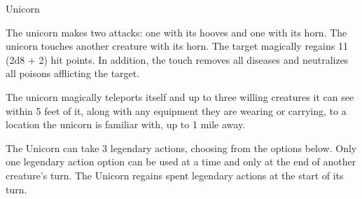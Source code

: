 \begin{DndMonster}[float*=htb,width=\textwidth + 8pt]{Unicorn}
\begin{multicols}{2}
 The unicorn makes two attacks: one with its hooves and one with its horn.
\DndMonsterAttack[
	name=Hooves,
	distance=melee,
	type=weapon,
	mod=+7,
	reach=5,
	dmg=\DndDice{2d4 + 4},
	dmg-type=bludgeoning
]
\DndMonsterAttack[
	name=Horn,
	distance=melee,
	type=weapon,
	mod=+7,
	reach=5,
	dmg=\DndDice{1d8 + 4},
	dmg-type=piercing
]
The unicorn touches another creature with its horn. The target magically regains 11 (2d8 + 2) hit points. In addition, the touch removes all diseases and neutralizes all poisons afflicting the target.

The unicorn magically teleports itself and up to three willing creatures it can see within 5 feet of it, along with any equipment they are wearing or carrying, to a location the unicorn is familiar with, up to 1 mile away.


The Unicorn can take 3 legendary actions, choosing from the options below. Only one legendary action option can be used at a time and only at the end of another creature's turn. The Unicorn regains spent legendary actions at the start of its turn.

\begin{DndMonsterLegendaryActions}
\end{DndMonsterLegendaryActions}
\end{multicols}
\end{DndMonster}